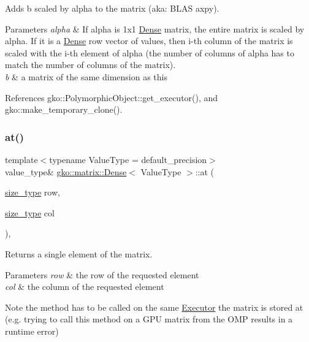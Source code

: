 Adds {\ttfamily b} scaled by {\ttfamily alpha} to the matrix (aka\+: B\+L\+AS axpy). 


\begin{DoxyParams}{Parameters}
{\em alpha} & If alpha is 1x1 \hyperlink{classgko_1_1matrix_1_1Dense}{Dense} matrix, the entire matrix is scaled by alpha. If it is a \hyperlink{classgko_1_1matrix_1_1Dense}{Dense} row vector of values, then i-\/th column of the matrix is scaled with the i-\/th element of alpha (the number of columns of alpha has to match the number of columns of the matrix). \\
\hline
{\em b} & a matrix of the same dimension as this \\
\hline
\end{DoxyParams}


References gko\+::\+Polymorphic\+Object\+::get\+\_\+executor(), and gko\+::make\+\_\+temporary\+\_\+clone().

\mbox{\label{classgko_1_1matrix_1_1Dense_af0f1af68853537807ca271a296de3cd0}} 
\subsubsection{\texorpdfstring{at()}{at()}\hspace{0.1cm}{\footnotesize\ttfamily [1/4]}}
{\footnotesize\ttfamily template$<$typename Value\+Type = default\+\_\+precision$>$ \\
value\+\_\+type\& \hyperlink{classgko_1_1matrix_1_1Dense}{gko\+::matrix\+::\+Dense}$<$ Value\+Type $>$\+::at (\begin{DoxyParamCaption}\item[{\hyperlink{namespacegko_a6e5c95df0ae4e47aab2f604a22d98ee7}{size\+\_\+type}}]{row,  }\item[{\hyperlink{namespacegko_a6e5c95df0ae4e47aab2f604a22d98ee7}{size\+\_\+type}}]{col }\end{DoxyParamCaption})\hspace{0.3cm}{\ttfamily [inline]}, {\ttfamily [noexcept]}}



Returns a single element of the matrix. 


\begin{DoxyParams}{Parameters}
{\em row} & the row of the requested element \\
\hline
{\em col} & the column of the requested element\\
\hline
\end{DoxyParams}
\begin{DoxyNote}{Note}
the method has to be called on the same \hyperlink{classgko_1_1Executor}{Executor} the matrix is stored at (e.\+g. trying to call this method on a G\+PU matrix from the O\+MP results in a runtime error) 
\end{DoxyNote}


